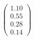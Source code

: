 \documentclass[preview]{standalone}
\begin{document}
\begin{align*}
\begin{pmatrix} 1.10 \\ 0.55 \\ 0.28 \\ 0.14 \end{pmatrix}
\end{align*}
\end{document}
